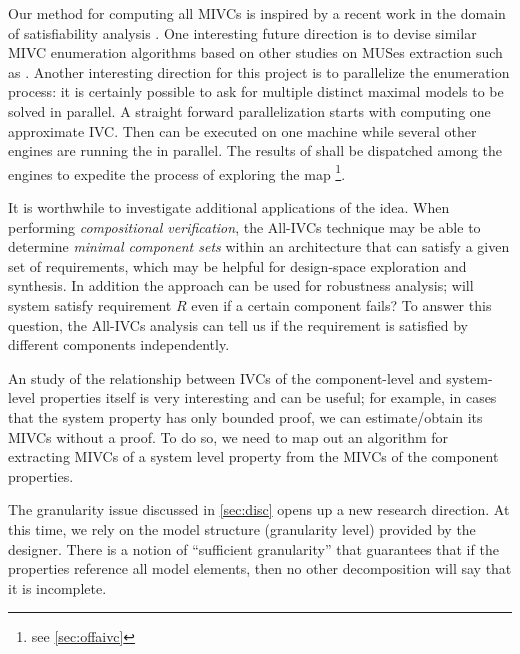 
Our method for computing all MIVCs is inspired by a recent work in the domain of satisfiability analysis \cite{marco2016fast}. One interesting future direction is to devise similar MIVC enumeration algorithms based on other studies on MUSes extraction such as \cite{nadel2014accelerated}.
Another interesting direction for this project is to parallelize the enumeration process: it is certainly possible to ask for multiple distinct maximal models to be solved in parallel.
A straight forward parallelization starts with computing one approximate IVC. Then \mustalg can be executed on one machine while several other engines are running the \aivcalg in parallel. The results of \mustalg shall be dispatched among the engines to expedite the process of exploring the map \footnote{see \ref{sec:offaivc}}.

It is worthwhile to investigate additional applications of the idea.  When performing {\em compositional verification}, the All-IVCs technique may be able to determine {\em minimal component sets} within an architecture that can satisfy a given set of requirements, which may be helpful for design-space exploration and synthesis. In addition the approach can be used for robustness analysis; will system satisfy requirement $R$ even if a certain component fails? To answer this question, the All-IVCs analysis can tell us if the requirement is satisfied by different components independently.


An study of the relationship between IVCs of the component-level and system-level properties itself is very interesting and can be useful; for example, in cases that the system property has only bounded proof, we can estimate/obtain its MIVCs without a proof. To do so, we need to map out an algorithm for extracting MIVCs of a system level property from the MIVCs of the component properties.

The granularity issue discussed in \ref{sec:disc} opens up a new research direction. At this time, we rely on the model structure (granularity level) provided by the designer. There is a notion of ``sufficient granularity'' that guarantees that if the properties reference all model elements, then no other decomposition will say that it is incomplete.

